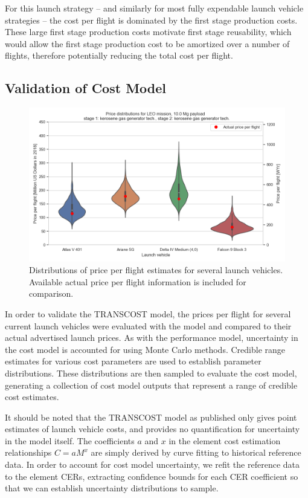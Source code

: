 \documentclass[conf]{new-aiaa}
\begin{document}
\begin{multicols}{2}
For this launch strategy -- and similarly for most fully expendable launch vehicle strategies -- the cost per flight is dominated by the first stage production costs. These large first stage production costs motivate first stage reusability, which would allow the first stage production cost to be amortized over a number of flights, therefore potentially reducing the total cost per flight. 

\subsection{Validation of Cost Model}

\begin{figure}
    \centering
    \includegraphics[width=\textwidth]{../../lvreuse/analysis/cost/plots/vehicle_ppf_validation}
    \caption{\label{fig:vehicle_ppf_validation} Distributions of price per flight estimates for several launch vehicles. Available actual price per flight information is included for comparison.}
\end{figure}

In order to validate the TRANSCOST model, the prices per flight for several current launch vehicles were evaluated with the model and compared to their actual advertised launch prices. As with the performance model, uncertainty in the cost model is accounted for using Monte Carlo methods. Credible range estimates for various cost parameters are used to establish parameter distributions. These distributions are then sampled to evaluate the cost model, generating a collection of cost model outputs that represent a range of credible cost estimates.

It should be noted that the TRANSCOST model as published only gives point estimates of launch vehicle costs, and provides no quantification for uncertainty in the model itself. The coefficients $a$ and $x$ in the element cost estimation relationships $C = a M^x$ are simply derived by curve fitting to historical reference data. In order to account for cost model uncertainty, we refit the reference data to the element CERs, extracting confidence bounds for each CER coefficient so that we can establish uncertainty distributions to sample. 


\end{multicols}
\end{document}
